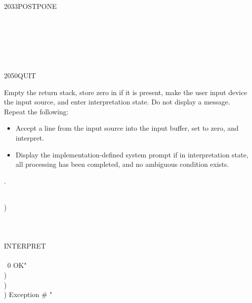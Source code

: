 \begin{worddef}{2033}{POSTPONE}
	\begin{testing} %
		 \\
		 \\

		 \\
		 \\
	\end{testing}
\end{worddef}


\begin{worddef}{2050}{QUIT}
\item \stack{}{}

	Empty the return stack, store zero in  if it is
	present, make the user input device the input source, and enter
	interpretation state. Do not display a message. Repeat the
	following:
	\begin{itemize}
	\item Accept a line from the input source into the input buffer,
		set  to zero, and interpret.
	\item Display the implementation-defined system prompt if in
		interpretation state, all processing has been completed,
		and no ambiguous condition exists.
	\end{itemize}

\see {}.

	\begin{implement}
		\word{:}  \\
		\tab {}  ) \\
		\tab {} \word{[} \\
		\tab[2]  \\
		\tab {} \\
		\tab[2] \word{[']} INTERPRET  \\
		\tab[2]  \\
		\tab[2] ~0     
			 OK"    \\
		    )  \\
		    )  \\
		\tab[2]   )   Exception \# "  \\
		\tab[2]  \\
		\tab {}  \\
		\word{;}


\end{implement}
\end{worddef}

